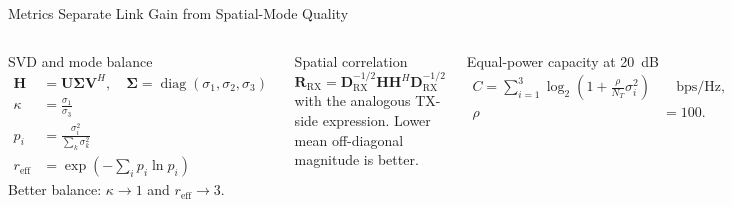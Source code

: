 \begin{frame}[t]{Metrics Separate Link Gain from Spatial-Mode Quality}
\scriptsize
\setlength{\abovedisplayskip}{0.35ex}
\setlength{\belowdisplayskip}{0.45ex}
\begin{columns}[T,onlytextwidth]
  \begin{block}{SVD and mode balance}
    {\tiny
    \begin{align*}
      \mathbf H&=\mathbf U\boldsymbol\Sigma\mathbf V^H,
      \quad\boldsymbol\Sigma=\operatorname{diag}(\sigma_1,\sigma_2,\sigma_3)
      \tag{2.21}\\[-1pt]
      \kappa&=\frac{\sigma_1}{\sigma_3}\tag{2.23}\\[-1pt]
      p_i&=\frac{\sigma_i^2}{\sum_k\sigma_k^2}\tag{2.24}\\[-1pt]
      r_{\mathrm{eff}}&=\exp\!\left(-\sum_i p_i\ln p_i\right)\tag{2.25}
    \end{align*}}
    Better balance: $\kappa\rightarrow1$ and $r_{\mathrm{eff}}\rightarrow3$.
  \end{block}

  \begin{block}{Spatial correlation}
    \begin{equation*}
      \mathbf R_{\mathrm{RX}}=\mathbf D_{\mathrm{RX}}^{-1/2}
      \mathbf H\mathbf H^H\mathbf D_{\mathrm{RX}}^{-1/2}
      \tag{2.26}
    \end{equation*}
    with the analogous TX-side expression. Lower mean off-diagonal magnitude is
    better.
  \end{block}

  \begin{block}{Equal-power capacity at 20~dB}
    \begin{align*}
      C=\sum_{i=1}^{3}\log_2\!\left(1+\frac{\rho}{N_T}\sigma_i^2\right)
      &\quad\mathrm{bps/Hz},\tag{2.27}\\[-2pt]
      \rho&=100.
    \end{align*}
  \end{block}


\end{columns}
\end{frame}

